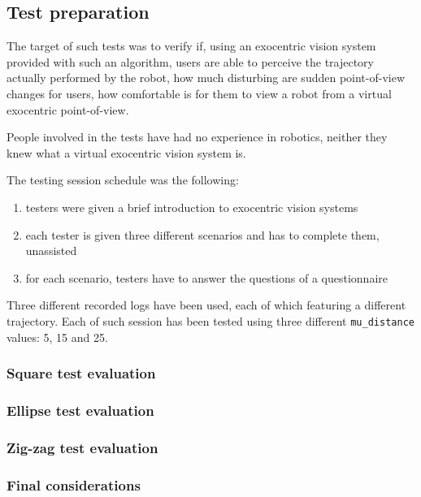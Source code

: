 \subsection{Test preparation}
\label{subsec:testpreparation}
%
The target of such tests was to verify  if, using 
an exocentric vision system provided with such an algorithm, 
users are able to perceive the trajectory actually 
performed by the robot,  how much disturbing are 
sudden point-of-view changes for users,  how 
comfortable is for them to view a robot from a 
virtual exocentric point-of-view.
%

%
People involved in the tests have had no experience in 
robotics, neither they knew what a virtual exocentric 
vision system is.
%

%
The testing session schedule was the following:
\begin{enumerate}
  \item testers were given a brief introduction to exocentric vision systems
  \item each tester is given three different scenarios and has to 
    complete them, unassisted
  \item for each scenario, testers have to answer the questions 
    of a questionnaire
\end{enumerate}
%

%
Three different recorded logs have been used, each of which featuring 
a different trajectory. Each of such session has been tested
using three different \texttt{mu\_distance} values: 5, 15 and 25. 
%
\subsubsection{Square test evaluation}
\label{subsubsec:squaretest}

\subsubsection{Ellipse test evaluation}
\label{subsubsec:ellipsetest}

\subsubsection{Zig-zag test evaluation}
\label{subsubsec:zigzagtest}

\subsubsection{Final considerations}
\label{subsubsec:finalconsiderations}
